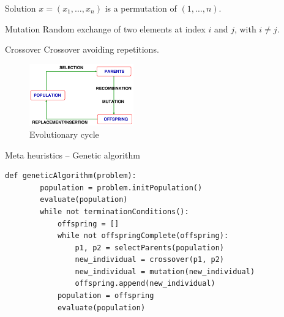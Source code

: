 \begin{example}
    Solution $x = (x_1, \dots, x_n)$ is a permutation of $(1, \dots, n)$.
    \begin{descriptionlist}
        \item[Mutation] Random exchange of two elements at index $i$ and $j$, with $i \neq j$.
        \item[Crossover] Crossover avoiding repetitions.
    \end{descriptionlist}
\end{example}

\begin{figure}[ht]
    \centering
    \includegraphics[width=0.4\textwidth]{img/_genetic_cycle.pdf}
    \caption{Evolutionary cycle}
\end{figure}

\begin{algorithm}
\caption{Meta heuristics -- Genetic algorithm}
\begin{lstlisting}[mathescape=true]
    def geneticAlgorithm(problem):
        population = problem.initPopulation()
        evaluate(population)
        while not terminationConditions():
            offspring = []
            while not offspringComplete(offspring):
                p1, p2 = selectParents(population)
                new_individual = crossover(p1, p2)
                new_individual = mutation(new_individual)
                offspring.append(new_individual)
            population = offspring
            evaluate(population)
\end{lstlisting}
\end{algorithm}